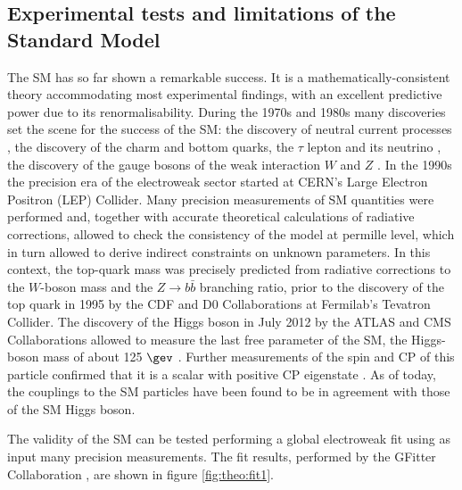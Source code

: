\subsection{Experimental tests and limitations of the Standard Model}

The SM has so far shown a remarkable success. It is a mathematically-consistent theory accommodating most experimental findings, with an excellent predictive power due to its renormalisability. During the 1970s and 1980s many discoveries set the scene for the success of the SM: the discovery of neutral current processes \cite{Hasert:1973ff}, the discovery of the charm \cite{PhysRevLett.33.1406,PhysRevLett.33.1404} and bottom \cite{Herb:1977ek} quarks, the $\tau$ lepton and its neutrino \cite{Perl:1975bf,Kodama:2000mp}, the discovery of the gauge bosons of the weak interaction $W$ and $Z$ \cite{Arnison:1983rp,Banner:1983jy,Arnison:1983mk,Bagnaia:1983zx}. In the 1990s the precision era of the electroweak sector started at CERN's Large Electron Positron (LEP) Collider. Many precision measurements of SM quantities were performed and, together with accurate theoretical calculations of radiative corrections, allowed to check the consistency of the model at permille level, which in turn allowed to derive indirect constraints on unknown parameters. In this context, the top-quark mass was precisely predicted from radiative corrections to the $W$-boson mass and the $Z\to b\bar{b}$ branching ratio, prior to the discovery of the top quark in 1995 by the CDF and D0 Collaborations \cite{topdisc_cdf,topdisc_d0} at Fermilab's Tevatron Collider. The discovery of the Higgs boson in July 2012 by the ATLAS and CMS Collaborations \cite{Aad:2012tfa,Chatrchyan:2012ufa} allowed to measure the last free parameter of the SM, the Higgs-boson mass of about 125 $\gev$ \cite{Aad:2015zhl}. Further measurements of the spin and CP of this particle confirmed that it is a scalar with positive CP eigenstate \cite{Aad:2013xqa,Khachatryan:2014kca}. As of today, the couplings to the SM particles \cite{Khachatryan:2016vau} have been found to be in agreement with those of the SM Higgs boson.\par
The validity of the SM can be tested performing a global electroweak fit using as input many precision measurements. The fit results, performed by the GFitter Collaboration \cite{Baak:2013ppa}, are shown in figure \ref{fig:theo:fit1}.
